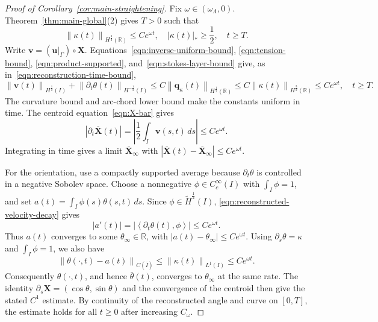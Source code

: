 \documentclass[11pt,reqno]{amsart}
\theoremstyle{plain}
\theoremstyle{definition}
\numberwithin{equation}{section}
\newcommand{\p}{\partial}
\newcommand{\wt}[1]{\widetilde{#1}}
\newcommand{\bm}[1]{\boldsymbol{#1}}
\newcommand{\norm}[1]{\left\lVert #1 \right\rVert}
\newcommand{\dual}[2]{\left\langle #1,#2 \right\rangle}
\newcommand{\R}{\mathbb{R}}
\newcommand{\hi}[1]{H^{#1}(I)}
\newcommand{\thi}[1]{\wt H^{#1}(I)}
\newcommand{\hr}[1]{H^{#1}(\R)}
\begin{document}
\begin{proof}[Proof of Corollary~\ref{cor:main-straightening}]
Fix $\omega\in(\omega_\Lambda,0)$. Theorem~\ref{thm:main-global}(2)
gives $T>0$ such that
\begin{equation*}
    \norm{\kappa(t)}_{\hr{\frac32}}\le Ce^{\omega t},
    \quad |\kappa(t)|_*\ge\frac12,\quad t\ge T.
\end{equation*}
Write $\bm v=(\bm u|_{\Gamma})\circ\bm X$.
Equations~\eqref{eqn:inverse-uniform-bound}, \eqref{eqn:tension-bound}, \eqref{eqn:product-supported}, and~\eqref{eqn:stokes-layer-bound} give, as in~\eqref{eqn:reconstruction-time-bound},
\begin{equation}\label{eqn:reconstructed-velocity-decay}
    \norm{\bm v(t)}_{\hi{\frac12}}
    +\norm{\p_t\theta(t)}_{\hi{-\frac12}}
    \le C\norm{\bm q_\kappa(t)}_{\hr{\frac12}}
    \le C\norm{\kappa(t)}_{\hr{\frac32}}
    \le Ce^{\omega t},\quad t\ge T.
\end{equation}
The curvature bound and arc-chord lower bound make the constants
uniform in time. The centroid equation~\eqref{eqn:X-bar} gives
\begin{equation*}
    |\p_t\overline{\bm X}(t)|
    =\left|\frac12\int_I\bm v(s,t)\,ds\right|
    \le Ce^{\omega t}.
\end{equation*}
Integrating in time gives a limit $\overline{\bm X}_\infty$ with
$|\overline{\bm X}(t)-\overline{\bm X}_\infty|\le Ce^{\omega t}$.

For the orientation, use a compactly supported average because
$\p_t\theta$ is controlled in a negative Sobolev space.
Choose a nonnegative $\phi\in C_c^\infty(I)$ with $\int_I\phi=1$, and set
$a(t)=\int_I\phi(s)\theta(s,t)\,ds$. Since
$\phi\in\thi{\frac12}$, \eqref{eqn:reconstructed-velocity-decay} gives
\begin{equation*}
    |a'(t)|=|\dual{\p_t\theta(t)}{\phi}|\le Ce^{\omega t}.
\end{equation*}
Thus $a(t)$ converges to some $\theta_\infty\in\R$, with
$|a(t)-\theta_\infty|\le Ce^{\omega t}$.
Using $\p_s\theta=\kappa$ and $\int_I\phi=1$, we also have
\begin{equation*}
    \norm{\theta(\cdot,t)-a(t)}_{C(\overline I)}
    \le\norm{\kappa(t)}_{L^1(I)}\le Ce^{\omega t}.
\end{equation*}
Consequently $\theta(\cdot,t)$, and hence $\bar\theta(t)$, converges to
$\theta_\infty$ at the same rate. The identity
$\p_s\bm X=(\cos\theta,\sin\theta)$ and the convergence of the centroid
then give the stated $C^1$ estimate. By continuity of the reconstructed
angle and curve on $[0,T]$, the estimate holds for all $t\ge0$ after
increasing $C_\omega$.
\end{proof}
\end{document}
